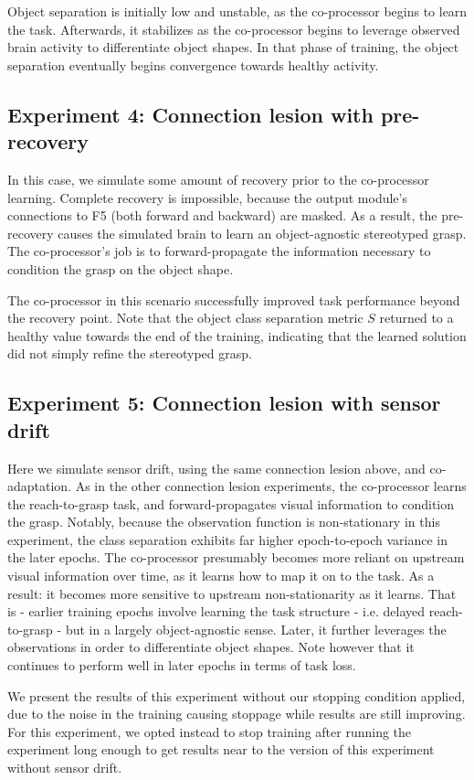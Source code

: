 \documentclass[12pt]{iopart}
\begin{document}
Object separation is initially low and unstable, as the co-processor begins
to learn the task. Afterwards, it stabilizes as the co-processor begins to
leverage observed brain activity to differentiate object shapes. In that
phase of training, the object separation eventually begins convergence towards
healthy activity.

\subsection{Experiment 4: Connection lesion with pre-recovery}
In this case, we simulate some amount of recovery prior to the co-processor
learning. Complete recovery is impossible, because the output module's
connections to F5 (both forward and backward) are masked. As a result,
the pre-recovery causes the simulated brain to learn an object-agnostic
stereotyped grasp. The co-processor's job is to forward-propagate the
information necessary to condition the grasp on the object shape.

The co-processor in this scenario successfully improved task performance
beyond the recovery point. Note that the object class separation metric
$S$ returned to a healthy value towards the end of the training,
indicating that the learned solution did not simply refine the
stereotyped grasp.

\subsection{Experiment 5: Connection lesion with sensor drift}
Here we simulate sensor drift, using the same connection lesion above, and
co-adaptation. As in the other connection lesion experiments, the co-processor
learns the reach-to-grasp task, and forward-propagates visual information to
condition the grasp. Notably, because the observation function is non-stationary
in this experiment, the class separation exhibits far higher epoch-to-epoch
variance in the later epochs. The co-processor presumably becomes more
reliant on upstream visual information over time, as it learns how to map it
on to the task. As a result: it becomes more sensitive to upstream
non-stationarity as it learns. That is - earlier training epochs involve
learning the task structure - i.e. delayed reach-to-grasp - but in a
largely object-agnostic sense. Later, it further leverages the observations
in order to differentiate object shapes. Note however that it continues to
perform well in later epochs in terms of task loss.

We present the results of this experiment without our stopping condition
applied, due to the noise in the training causing stoppage while results
are still improving. For this experiment, we opted instead to stop training
after running the experiment long enough to get results near to the version
of this experiment without sensor drift.
\end{document}
